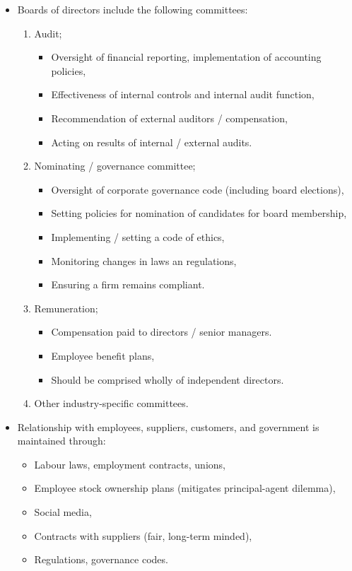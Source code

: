 \documentclass[../notes_compiled.tex]{subfiles}
\begin{document}
\begin{itemize}
\item Boards of directors include the following committees:
\begin{enumerate}
\item Audit;
\begin{itemize}
\item Oversight of financial reporting, implementation of accounting policies,
\item Effectiveness of internal controls and internal audit function,
\item Recommendation of external auditors / compensation,
\item Acting on results of internal / external audits.
\end{itemize}
\item Nominating / governance committee;
\begin{itemize}
\item Oversight of corporate governance code (including board elections),
\item Setting policies for nomination of candidates for board membership,
\item Implementing / setting a code of ethics,
\item Monitoring changes in laws an regulations,
\item Ensuring a firm remains compliant.
\end{itemize}
\item Remuneration;
\begin{itemize}
\item Compensation paid to directors / senior managers.
\item Employee benefit plans,
\item Should be comprised wholly of independent directors.
\end{itemize}
\item Other industry-specific committees.
\end{enumerate}

\item Relationship with employees, suppliers, customers, and government is maintained through:
\begin{itemize}
\item Labour laws, employment contracts, unions,
\item Employee stock ownership plans (mitigates principal-agent dilemma),
\item Social media,
\item Contracts with suppliers (fair, long-term minded),
\item Regulations, governance codes.
\end{itemize}


\end{itemize}
\end{document}
